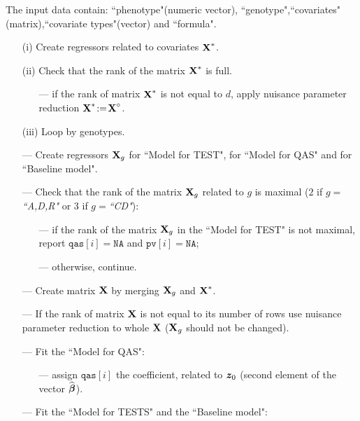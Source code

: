 \documentclass[11pt]{article}
\begin{document}
\noindent The input data contain: ``phenotype"(numeric vector), ``genotype",``covariates"(matrix),``covariate types"(vector) and ``formula".
 \vspace{-2mm}
\begin{itemize}
\setlength\itemsep{-0.3em}
\item[(i)]
Create regressors related to covariates $\mbox{\bf X}^*$.
\item[(ii)]
Check that the rank of the matrix $\mbox{\bf X}^*$ is full.\vspace{-2mm}
\begin{itemize}
\setlength\itemsep{-0.3em}
\item[---]
if the rank of matrix $\mbox{\bf X}^*$ is not equal to $d$,  apply nuisance parameter reduction $\mbox{\bf X}^*\!:=\!\mbox{\bf X}^{\circ}$. 
\end{itemize}
\item[(iii)]
Loop by genotypes.
\item[---]
Create regressors $\mbox{\bf X}_g$ for ``Model for TEST", for ``Model for QAS" and for ``Baseline model".
\item[---]
Check that the rank of the matrix $\mbox{\bf X}_g$ related to $g$ is maximal ($2$ if $g=${\it ``A,D,R"} or 3 if $g=${\it ``CD"}):
\vspace{-2mm}
\begin{itemize}
\setlength\itemsep{-0.3em}
\item[---]
if the rank of the matrix $\mbox{\bf X}_g$ in the ``Model for TEST" is not maximal, report $\mathtt{qas}[i]=\mathtt{NA}$ and $\mathtt{pv}[i]=\mathtt{NA}$;
\item[---]
otherwise, continue.
\end{itemize}
\item[---]
Create matrix $\mbox{\bf X}$ by merging $\mbox{\bf X}_g$ and $\mbox{\bf X}^*$.
\item[---]
If the rank of matrix $\mbox{\bf X}$ is not equal to its number of rows use nuisance parameter reduction to whole $\mbox{\bf X}$ ($\mbox{\bf X}_g$ should not be changed).
\item[---]
Fit the ``Model for QAS":
\vspace{-2mm}
\begin{itemize}
\setlength\itemsep{-0.1em}
\item[---]
assign $\mathtt{qas}[i]$ the coefficient, related to $\mbox{\textbf{\textit z}}_0$ (second element of the vector $\widehat{{\boldsymbol \beta}}$).
\end{itemize}
\item[---]
Fit the ``Model for TESTS" and the ``Baseline model":
\vspace{-2mm}
\begin{itemize}

\end{itemize}
\end{itemize}
\end{document}
